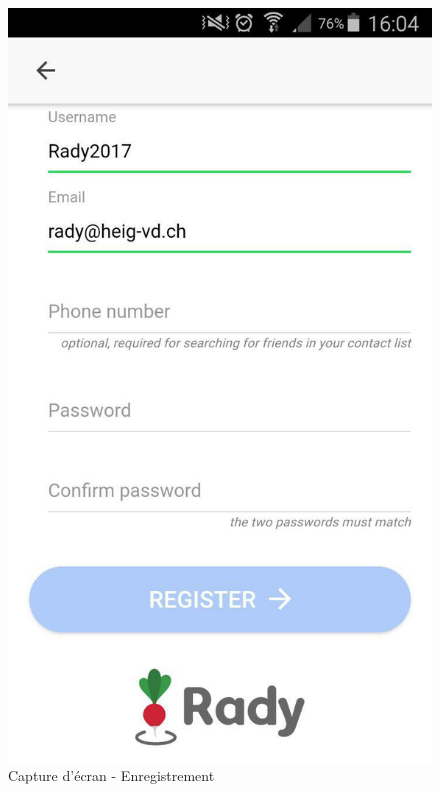 \documentclass[french]{article}
\begin{document}
	\begin{figure}[H]
		\begin{minipage}[c]{.46\linewidth}
			\centering
			\includegraphics[scale=0.20]{../screenshot/screenshot-register.jpg}
			\caption{Capture d'écran - Enregistrement}
			\label{Capture d'écran - Enregistrement}
		\end{minipage} \hfill
		\begin{minipage}[c]{.46\linewidth}
			\centering

\end{minipage}
\end{figure}
\end{document}
